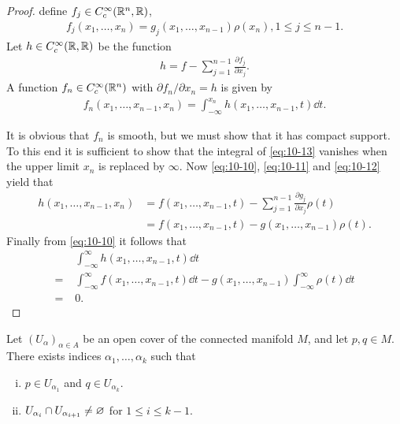 \begin{proof}
  define $f_j\in C_c^\infty({\mathbb{R}}^n, {\mathbb{R}})$,
  \begin{align}\label{eq:10-11}
    f_j(x_1, \ldots, x_n) = g_j(x_1, \ldots, x_{n-1})\rho(x_n), 1\le j\le n-1.
  \end{align}
  Let $h\in C_c^\infty({\mathbb{R}}, {\mathbb{R}})$ be the function
  \begin{align}\label{eq:10-12}
    h = f - \sum_{j=1}^{n-1}{\frac{\partial f_j}{\partial x_j}}.
  \end{align}
  A function $f_n \in C_c^\infty({\mathbb{R}}^n)$ with $\partial f_n/\partial x_n=h$ is given by
  \begin{align}\label{eq:10-13}
    f_n(x_1, \ldots, x_{n-1}, x_n) = \int_{-\infty}^{x_n} h(x_1, \ldots, x_{n-1}, t)\dd t.
  \end{align}

  It is obvious that $f_n$ is smooth, but we must show that it has compact support. To
  this end it is sufficient to show that the integral of \eqref{eq:10-13} vanishes when the upper
  limit $x_n$ is replaced by $\infty$. Now \eqref{eq:10-10}, \eqref{eq:10-11} and \eqref{eq:10-12} yield 
  that
  \begin{align*}
    h(x_1, \ldots, x_{n-1}, x_n) 
    & = f(x_1, \ldots, x_{n-1}, t) - \sum_{j=1}^{n-1}{\frac{\partial g_j}{\partial x_j}}\rho(t)\\
    & = f(x_1, \ldots, x_{n-1}, t) - g(x_1, \ldots, x_{n-1})\rho(t).
  \end{align*}
  Finally from \eqref{eq:10-10} it follows that 
  \begin{align*}
    & \int_{-\infty}^\infty h(x_1, \ldots, x_{n-1}, t)\dd t \\
    = & \int_{-\infty}^\infty f(x_1, \ldots, x_{n-1}, t)\dd t 
      - g(x_1, \ldots, x_{n-1})\int_{-\infty}^\infty \rho(t)\dd t\\
    =\; & 0.
  \end{align*}
\end{proof}

\begin{lemma}\label{lemma:10-16}
  Let $(U_\alpha)_{\alpha\in A}$ be an open cover of the connected manifold $M$, and 
  let $p, q\in M$. There exists indices $\alpha_1, \ldots, \alpha_k$ such that 
  \begin{enumerate}[(i)]
    \item $p\in U_{\alpha_1}$ and $q\in U_{\alpha_k}$.
    \item $U_{\alpha_i}\cap U_{\alpha_{i+1}}\neq\varnothing$ for $1\le i\le k-1$.
  \end{enumerate}
\end{lemma}

